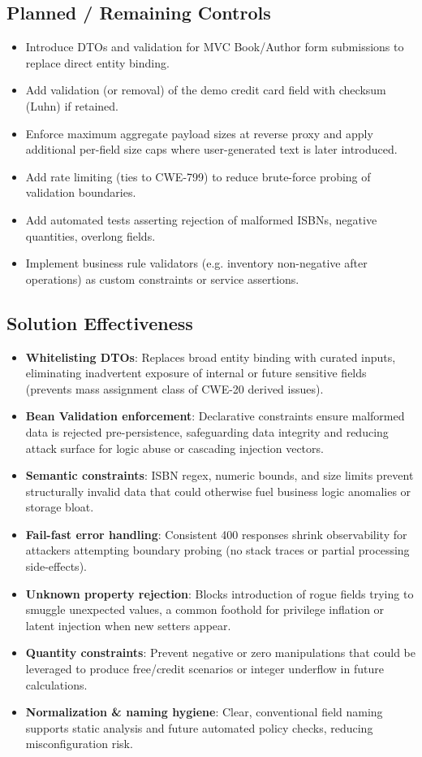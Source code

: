 \documentclass[]{UCD_CS_FYP_Report}
\begin{document}
\subsection*{Planned / Remaining Controls}
\begin{itemize}
	\item Introduce DTOs and validation for MVC Book/Author form submissions to replace direct entity binding.
	\item Add validation (or removal) of the demo credit card field with checksum (Luhn) if retained.
	\item Enforce maximum aggregate payload sizes at reverse proxy and apply additional per-field size caps where user-generated text is later introduced.
	\item Add rate limiting (ties to CWE-799) to reduce brute-force probing of validation boundaries.
	\item Add automated tests asserting rejection of malformed ISBNs, negative quantities, overlong fields.
	\item Implement business rule validators (e.g. inventory non-negative after operations) as custom constraints or service assertions.
\end{itemize}


\subsection*{Solution Effectiveness}
\begin{itemize}
	\item \textbf{Whitelisting DTOs}: Replaces broad entity binding with curated inputs, eliminating inadvertent exposure of internal or future sensitive fields (prevents mass assignment class of CWE-20 derived issues).
	\item \textbf{Bean Validation enforcement}: Declarative constraints ensure malformed data is rejected pre-persistence, safeguarding data integrity and reducing attack surface for logic abuse or cascading injection vectors.
	\item \textbf{Semantic constraints}: ISBN regex, numeric bounds, and size limits prevent structurally invalid data that could otherwise fuel business logic anomalies or storage bloat.
	\item \textbf{Fail-fast error handling}: Consistent 400 responses shrink observability for attackers attempting boundary probing (no stack traces or partial processing side-effects).
	\item \textbf{Unknown property rejection}: Blocks introduction of rogue fields trying to smuggle unexpected values, a common foothold for privilege inflation or latent injection when new setters appear.
	\item \textbf{Quantity constraints}: Prevent negative or zero manipulations that could be leveraged to produce free/credit scenarios or integer underflow in future calculations.
	\item \textbf{Normalization \& naming hygiene}: Clear, conventional field naming supports static analysis and future automated policy checks, reducing misconfiguration risk.
\end{itemize}
\end{document}
